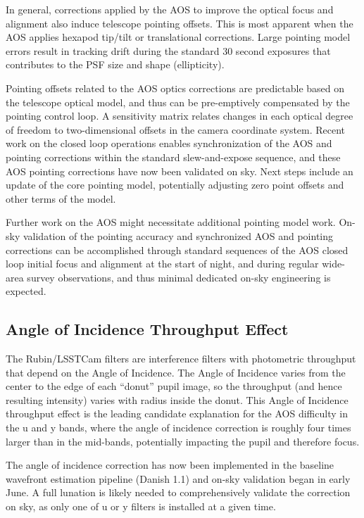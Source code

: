 \documentclass[SO,lsst,authoryear,toc]{lsstdoc}
\begin{document}
In general, corrections applied by the AOS to improve the optical focus and alignment also induce telescope pointing offsets.
This is most apparent when the AOS applies hexapod tip/tilt or translational corrections. Large pointing model errors result in tracking drift during the standard 30 second exposures that contributes to the PSF size and shape (ellipticity).

Pointing offsets related to the AOS optics corrections are predictable based on the telescope optical model, and thus can be pre-emptively compensated by the pointing control loop.
A sensitivity matrix relates changes in each optical degree of freedom to two-dimensional offsets in the camera coordinate system.
Recent work on the closed loop operations enables synchronization of the AOS and pointing corrections within the standard slew-and-expose sequence, and these AOS pointing corrections have now been validated on sky.
Next steps include an update of the core pointing model, potentially adjusting zero point offsets and other terms of the model.

Further work on the AOS might necessitate additional pointing model work.
On-sky validation of the pointing accuracy and synchronized AOS and pointing corrections can be accomplished through standard sequences of the AOS closed loop initial focus and alignment at the start of night, and during regular wide-area survey observations, and thus minimal dedicated on-sky engineering is expected.

\subsection{Angle of Incidence Throughput Effect}
\label{sec:angle_of_incidence}

The Rubin/LSSTCam filters are interference filters with photometric throughput that depend on the Angle of Incidence.
The Angle of Incidence varies from the center to the edge of each ``donut'' pupil image, so the throughput (and hence resulting intensity) varies with radius inside the donut.
This Angle of Incidence throughput effect is the leading candidate explanation for the AOS difficulty in the u and y bands, where the angle of incidence correction is roughly four times larger than in the mid-bands, potentially impacting the pupil and therefore focus.

The angle of incidence correction has now been implemented in the baseline wavefront estimation pipeline (Danish 1.1) and on-sky validation began in early June.
A full lunation is likely needed to comprehensively validate the correction on sky, as only one of u or y filters is installed at a given time.
\end{document}
